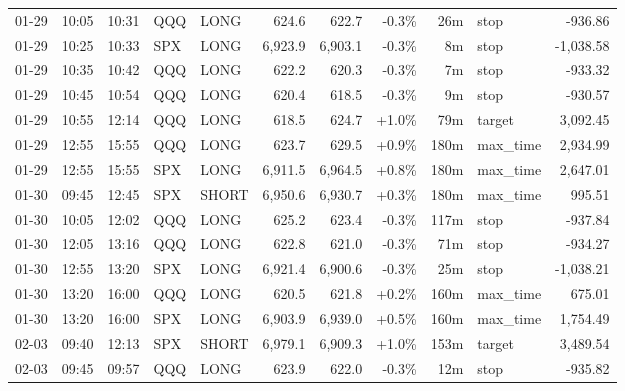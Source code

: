 \documentclass[11pt,a4paper,twoside]{article}
\begin{document}
\begin{center}
\begin{longtable}{>{\color{txtmain}}l l l l l r r r r >{\color{txtmain}}l r}
01-29 & 10:05 & 10:31 & QQQ & LONG & 624.6 & 622.7 & \textcolor{lossred}{-0.3\%} & 26m & stop & \textcolor{lossred}{-936.86} \\
01-29 & 10:25 & 10:33 & SPX & LONG & 6,923.9 & 6,903.1 & \textcolor{lossred}{-0.3\%} & 8m & stop & \textcolor{lossred}{-1,038.58} \\
01-29 & 10:35 & 10:42 & QQQ & LONG & 622.2 & 620.3 & \textcolor{lossred}{-0.3\%} & 7m & stop & \textcolor{lossred}{-933.32} \\
01-29 & 10:45 & 10:54 & QQQ & LONG & 620.4 & 618.5 & \textcolor{lossred}{-0.3\%} & 9m & stop & \textcolor{lossred}{-930.57} \\
01-29 & 10:55 & 12:14 & QQQ & LONG & 618.5 & 624.7 & \textcolor{wingreen}{+1.0\%} & 79m & target & \textcolor{wingreen}{3,092.45} \\
01-29 & 12:55 & 15:55 & QQQ & LONG & 623.7 & 629.5 & \textcolor{wingreen}{+0.9\%} & 180m & max\_time & \textcolor{wingreen}{2,934.99} \\
01-29 & 12:55 & 15:55 & SPX & LONG & 6,911.5 & 6,964.5 & \textcolor{wingreen}{+0.8\%} & 180m & max\_time & \textcolor{wingreen}{2,647.01} \\
01-30 & 09:45 & 12:45 & SPX & SHORT & 6,950.6 & 6,930.7 & \textcolor{wingreen}{+0.3\%} & 180m & max\_time & \textcolor{wingreen}{995.51} \\
01-30 & 10:05 & 12:02 & QQQ & LONG & 625.2 & 623.4 & \textcolor{lossred}{-0.3\%} & 117m & stop & \textcolor{lossred}{-937.84} \\
01-30 & 12:05 & 13:16 & QQQ & LONG & 622.8 & 621.0 & \textcolor{lossred}{-0.3\%} & 71m & stop & \textcolor{lossred}{-934.27} \\
01-30 & 12:55 & 13:20 & SPX & LONG & 6,921.4 & 6,900.6 & \textcolor{lossred}{-0.3\%} & 25m & stop & \textcolor{lossred}{-1,038.21} \\
01-30 & 13:20 & 16:00 & QQQ & LONG & 620.5 & 621.8 & \textcolor{wingreen}{+0.2\%} & 160m & max\_time & \textcolor{wingreen}{675.01} \\
01-30 & 13:20 & 16:00 & SPX & LONG & 6,903.9 & 6,939.0 & \textcolor{wingreen}{+0.5\%} & 160m & max\_time & \textcolor{wingreen}{1,754.49} \\
02-03 & 09:40 & 12:13 & SPX & SHORT & 6,979.1 & 6,909.3 & \textcolor{wingreen}{+1.0\%} & 153m & target & \textcolor{wingreen}{3,489.54} \\
02-03 & 09:45 & 09:57 & QQQ & LONG & 623.9 & 622.0 & \textcolor{lossred}{-0.3\%} & 12m & stop & \textcolor{lossred}{-935.82} \\

\end{longtable}
\end{center}
\end{document}
